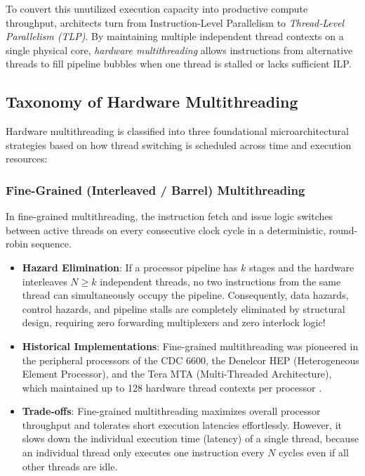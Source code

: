 To convert this unutilized execution capacity into productive compute throughput, architects turn from Instruction-Level Parallelism to \textit{Thread-Level Parallelism (TLP)}. By maintaining multiple independent thread contexts on a single physical core, \textit{hardware multithreading} allows instructions from alternative threads to fill pipeline bubbles when one thread is stalled or lacks sufficient ILP.

\subsection{Taxonomy of Hardware Multithreading}

Hardware multithreading is classified into three foundational microarchitectural strategies based on how thread switching is scheduled across time and execution resources:

\subsubsection{Fine-Grained (Interleaved / Barrel) Multithreading}\label{sec:barrel_multithreading}
In fine-grained multithreading, the instruction fetch and issue logic switches between active threads on every consecutive clock cycle in a deterministic, round-robin sequence. 
\begin{itemize}
    \item \textbf{Hazard Elimination}: If a processor pipeline has $k$ stages and the hardware interleaves $N \ge k$ independent threads, no two instructions from the same thread can simultaneously occupy the pipeline. Consequently, data hazards, control hazards, and pipeline stalls are completely eliminated by structural design, requiring zero forwarding multiplexers and zero interlock logic!
    
    \item \textbf{Historical Implementations}: Fine-grained multithreading was pioneered in the peripheral processors of the CDC 6600, the Denelcor HEP (Heterogeneous Element Processor), and the Tera MTA (Multi-Threaded Architecture), which maintained up to 128 hardware thread contexts per processor \cite{thornton1964, smith1978hep}.
    
    \item \textbf{Trade-offs}: Fine-grained multithreading maximizes overall processor throughput and tolerates short execution latencies effortlessly. However, it slows down the individual execution time (latency) of a single thread, because an individual thread only executes one instruction every $N$ cycles even if all other threads are idle.
\end{itemize}

